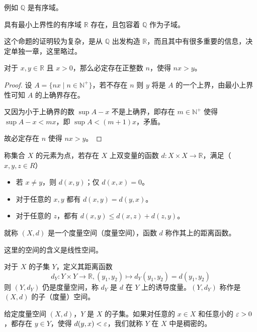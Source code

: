 例如 $\mathbb{Q}$ 是有序域。

\begin{theorem}[存在定理]
	具有最小上界性的有序域 $\mathbb{R}$ 存在，且包容着 $\mathbb{Q}$ 作为子域。
\end{theorem}

这个命题的证明较为复杂，是从 $\mathbb{Q}$ 出发构造 $\mathbb{R}$，而且其中有很多重要的信息，决定单独一章，这里略过。

\begin{theorem}[Achimedes 原理]
	对于 $x,y \in \mathbb{R}$ 且 $x>0$，那么必定存在正整数 $n$，使得 $nx>y$。
\end{theorem}
\begin{proof}
	设 $A = \{nx \mid n \in \mathbb{N}^+ \}$，若不存在 $n$ 则 $y$ 将是 $A$ 的一个上界，由最小上界性可知 $A$ 的上确界存在。

	又因为小于上确界的数 $\sup A-x$ 不是上确界，即存在 $m\in \mathbb{N}^+$ 使得 $\sup A -x <mx$，即 $\sup A < (m+1)x$，矛盾。

	故必定存在 $n$ 使得 $nx>y$。
\end{proof}

\begin{definition}[度量空间]
	称集合 $X$ 的元素为点，若存在 $X$ 上双变量的函数 $d:X \times X \to \mathbb{R}$，满足（$x,y,z\in R$）

	\begin{itemize}
		\item 若 $x\ne y$，则 $d(x,y)$；仅 $d(x,x)=0$。

		\item 对于任意的 $x,y$ 都有 $d(x,y) = d(y,x)$。

		\item 对于任意的 $z$，都有 $d(x,y) \leqslant d(x,z) + d(z,y)$。
	\end{itemize}

	就称 $(X,d)$ 是一个度量空间（度量空间），函数 $d$ 称作其上的距离函数。
\end{definition}

这里的空间的含义是线性空间。

对于 $X$ 的子集 $Y$，定义其距离函数
\[ d_Y: Y \times Y \to \mathbb{R}, (y_1,y_2) \mapsto d_Y(y_1,y_2)=d(y_1,y_2)\]
则 $(Y,d_Y)$ 仍是度量空间，称 $d_Y$ 是 $d$ 在 $Y$ 上的诱导度量。$(Y,d_Y)$ 称作是 $(X,d)$ 的子（度量）空间。

\begin{definition}[稠密性]
	给定度量空间 $(X,d)$，$Y$ 是 $X$ 的子集。如果对任意的 $x\in X$ 和任意小的 $\varepsilon>0$，都存在 $y\in Y$，使得 $d(y,x)<\varepsilon$，我们就称 $Y$ 在 $X$ 中是稠密的。
\end{definition}

